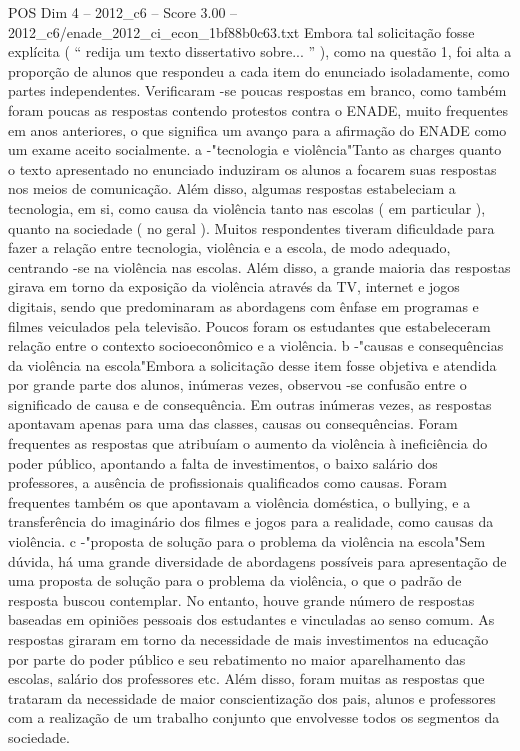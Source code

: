 \begin{textsample}{POS Dim 4 – 2012\_c6 – Score 3.00 – 2012\_c6/enade\_2012\_ci\_econ\_1bf88b0c63.txt}
Embora tal solicitação fosse explícita ( “ redija um texto dissertativo sobre... ” ), como na questão 1, foi alta a proporção de alunos que respondeu a cada item do enunciado isoladamente, como partes independentes.
Verificaram -se poucas respostas em branco, como também foram poucas as respostas contendo protestos contra o ENADE, muito frequentes em anos anteriores, o que significa um avanço para a afirmação do ENADE como um exame aceito socialmente. a -"tecnologia e violência"Tanto as charges quanto o texto apresentado no enunciado induziram os alunos a focarem suas respostas nos meios de comunicação.
Além disso, algumas respostas estabeleciam a tecnologia, em si, como causa da violência tanto nas escolas ( em particular ), quanto na sociedade ( no geral ).
Muitos respondentes tiveram dificuldade para fazer a relação entre tecnologia, violência e a escola, de modo adequado, centrando -se na violência nas escolas.
Além disso, a grande maioria das respostas girava em torno da exposição da violência através da TV, internet e jogos digitais, sendo que predominaram as abordagens com ênfase em programas e filmes veiculados pela televisão.
Poucos foram os estudantes que estabeleceram relação entre o contexto socioeconômico e a violência. b -"causas e consequências da violência na escola"Embora a solicitação desse item fosse objetiva e atendida por grande parte dos alunos, inúmeras vezes, observou -se confusão entre o significado de causa e de consequência.
Em outras inúmeras vezes, as respostas apontavam apenas para uma das classes, causas ou consequências.
Foram frequentes as respostas que atribuíam o aumento da violência à ineficiência do poder público, apontando a falta de investimentos, o baixo salário dos professores, a ausência de profissionais qualificados como causas.
Foram frequentes também os que apontavam a violência doméstica, o bullying, e a transferência do imaginário dos filmes e jogos para a realidade, como causas da violência. c -"proposta de solução para o problema da violência na escola"Sem dúvida, há uma grande diversidade de abordagens possíveis para apresentação de uma proposta de solução para o problema da violência, o que o padrão de resposta buscou contemplar.
No entanto, houve grande número de respostas baseadas em opiniões pessoais dos estudantes e vinculadas ao senso comum.
As respostas giraram em torno da necessidade de mais investimentos na educação por parte do poder público e seu rebatimento no maior aparelhamento das escolas, salário dos professores etc.
Além disso, foram muitas as respostas que trataram da necessidade de maior conscientização dos pais, alunos e professores com a realização de um trabalho conjunto que envolvesse todos os segmentos da sociedade.

\end{textsample}
